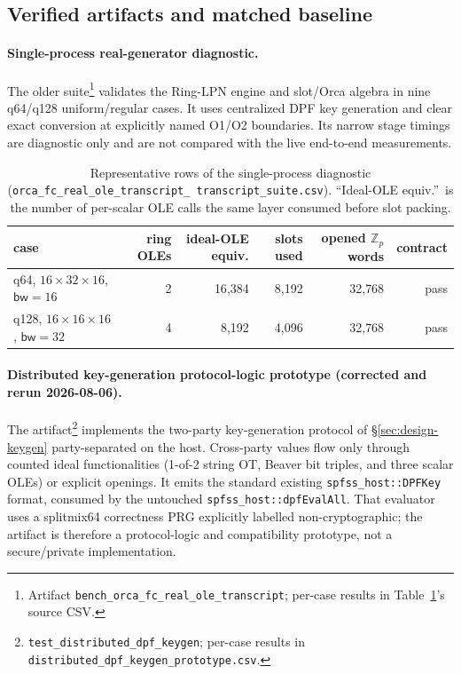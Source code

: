 \documentclass[11pt]{article}
\newcommand{\Z}{\mathbb{Z}}
\newcommand{\bw}{\mathsf{bw}}
\begin{document}
\subsection{Verified artifacts and matched baseline}
\label{sec:baseline}

\paragraph{Single-process real-generator diagnostic.} The older
suite\footnote{Artifact \texttt{bench\_orca\_fc\_real\_ole\_transcript}; per-case
results in Table~\ref{tab:suite}'s source CSV.} validates the Ring-LPN engine
and slot/Orca algebra in nine q64/q128 uniform/regular cases. It uses
centralized DPF key generation and clear exact conversion at explicitly named
O1/O2 boundaries. Its narrow stage timings are diagnostic only and are not
compared with the live end-to-end measurements.

\begin{table}[ht]
\centering
\small
\begin{tabular}{lrrrrr}
\toprule
case & ring OLEs & ideal-OLE equiv. & slots used & opened $\Z_p$ words & contract\\
\midrule
q64, $16{\times}32{\times}16$, $\bw{=}16$ & 2 & 16{,}384 & 8{,}192 & 32{,}768 & pass\\
q128, $16{\times}16{\times}16$, $\bw{=}32$ & 4 & 8{,}192 & 4{,}096 & 32{,}768 & pass\\
\bottomrule
\end{tabular}
\caption{Representative rows of the single-process diagnostic
(\texttt{orca\_fc\_real\_ole\_\allowbreak transcript\_\allowbreak
transcript\_\allowbreak suite.csv}). ``Ideal-OLE equiv.''\ is the number of
per-scalar OLE calls the same layer consumed before slot packing.}
\label{tab:suite}
\end{table}

\paragraph{Distributed key-generation protocol-logic prototype
(corrected and rerun 2026-08-06).}
\label{sec:m1proto}
The artifact\footnote{\texttt{test\_distributed\_dpf\_keygen}; per-case
results in \texttt{distributed\_dpf\_keygen\_prototype.csv}.} implements the
two-party key-generation protocol of \S\ref{sec:design-keygen}
party-separated on the host. Cross-party values flow only through counted
ideal functionalities (1-of-2 string OT, Beaver bit triples, and three
scalar OLEs) or explicit openings. It emits the standard existing
\texttt{spfss\_host::DPFKey} format, consumed by the untouched
\texttt{spfss\_host::dpfEvalAll}. That evaluator uses a splitmix64
correctness PRG explicitly labelled non-cryptographic; the artifact is
therefore a protocol-logic and compatibility prototype, not a secure/private
implementation.
\end{document}
